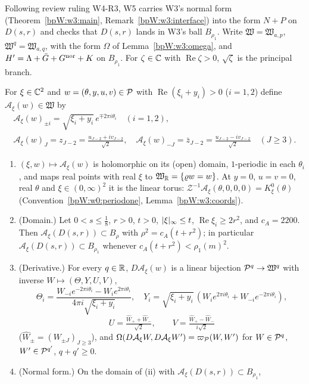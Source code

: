 Following review ruling W4-R3, W5 carries W3's normal form (Theorem~\ref{bpW:w3:main},
Remark~\ref{bpW:w3:interface}) into the form $N+P$ on $D(s,r)$ and checks that $D(s,r)$ lands in W3's ball
$B_{\rho_1}$. Write $\mathfrak W=\mathfrak W_{a,p}$, $\mathfrak W^q=\mathfrak W_{a,q}$, with the form $\Omega$ of
Lemma~\ref{bpW:w3:omega}, and $H'=\Lambda+\bar G+G^{\rm nor}+K$ on $B_{\rho_1}$. For $\zeta\in\mathbb{C}$ with
$\operatorname{Re}\zeta>0$, $\sqrt\zeta$ is the principal branch.

\begin{lemma}\label{bpW:w5:action-angle}
For $\xi\in\mathbb{C}^2$ and $w=(\theta,y,u,v)\in\mathcal P$ with $\operatorname{Re}(\xi_i+y_i)>0$ ($i=1,2$) define
$\mathcal A_\xi(w)\in\mathfrak W$ by
\begin{gather*}\mathcal A_\xi(w)_{\pm i}=\sqrt{\xi_i+y_i}\,e^{\mp2\pi i\theta_i}\quad(i=1,2),\\
\mathcal A_\xi(w)_{J}=z_{J-2}=\tfrac{u_{J-2}+iv_{J-2}}{\sqrt2},\quad\mathcal A_\xi(w)_{-J}=\bar z_{J-2}=\tfrac{u_{J-2}-iv_{J-2}}{\sqrt2}\quad(J\ge3).\end{gather*}
\begin{enumerate}[label=(\roman*)]
\item $(\xi,w)\mapsto\mathcal A_\xi(w)$ is holomorphic on its (open) domain, $1$-periodic in each $\theta_i$, and maps
  real points with real $\xi$ to $\mathfrak W_{\mathbb{R}}=\{\varrho w=w\}$. At $y=0$, $u=v=0$, real $\theta$ and $\xi\in(0,\infty)^2$
  it is the linear torus: $\mathcal Z^{-1}\mathcal A_\xi(\theta,0,0,0)=K^0_\xi(\theta)$ (Convention~\ref{bpW:w0:periodone},
  Lemma~\ref{bpW:w3:coords}).
\item (Domain.) Let $0<s\le\frac18$, $r>0$, $t>0$, $\lvert \xi\rvert_\infty\le t$, $\operatorname{Re}\xi_i\ge2r^2$, and
  $c_A=2200$. Then $\mathcal A_\xi(D(s,r))\subset B_{\rho}$ with $\rho^2=c_A(t+r^2)$; in particular
  $\mathcal A_\xi(D(s,r))\subset B_{\rho_1}$ whenever $c_A(t+r^2)<\rho_1(m)^2$.
\item (Derivative.) For every $q\in\mathbb{R}$, $D\mathcal A_\xi(w)$ is a linear bijection $\mathcal P^q\to\mathfrak W^q$ with inverse
  $W\mapsto(\Theta,Y,U,V)$,
  \[\Theta_i=\frac{W_{-i}e^{-2\pi i\theta_i}-W_ie^{2\pi i\theta_i}}{4\pi i\sqrt{\xi_i+y_i}},\quad
  Y_i=\sqrt{\xi_i+y_i}\,(W_ie^{2\pi i\theta_i}+W_{-i}e^{-2\pi i\theta_i}),\]
  \[U=\tfrac{\hat W_++\hat W_-}{\sqrt2},\qquad V=\tfrac{\hat W_+-\hat W_-}{i\sqrt2}\]
  ($\hat W_\pm=(W_{\pm J})_{J\ge3}$), and $\Omega(D\mathcal A_\xi W,D\mathcal A_\xi W')=\varpi_{\mathcal P}(W,W')$ for $W\in\mathcal P^q$,
  $W'\in\mathcal P^{q'}$, $q+q'\ge0$.
\item (Normal form.) On the domain of (ii) with $\mathcal A_\xi(D(s,r))\subset B_{\rho_1}$,

\end{enumerate}
\end{lemma}
